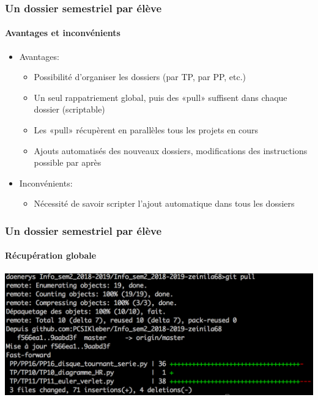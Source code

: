 \begin{frame}
	\frametitle{Un dossier semestriel par élève}
	\framesubtitle{Avantages et inconvénients}

	\begin{itemize}[<+->]
		\item Avantages:
			\begin{itemize}[<+->]
				\item Possibilité d'organiser les dossiers (par TP, par PP, etc.)

				\item Un seul rappatriement global, puis des «pull» suffisent dans chaque dossier (scriptable)

				\item Les «pull» récupèrent en parallèles tous les projets en cours

				\item Ajouts automatisés des nouveaux dossiers, modifications des instructions possible par après
			\end{itemize}
		\item Inconvénients:
			\begin{itemize}[<+->]
				\item Nécessité de savoir scripter l'ajout automatique dans tous les dossiers
			\end{itemize}
	\end{itemize}

\end{frame}

\begin{frame}
	\frametitle{Un dossier semestriel par élève}
	\framesubtitle{Récupération globale}

	\begin{center}
		\includegraphics[width=\linewidth]{figures/git_pull.png}
	\end{center}
\end{frame}


